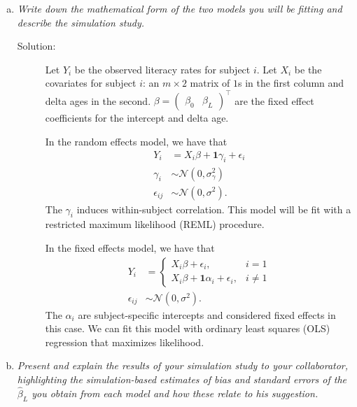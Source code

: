 \documentclass[11pt, letterpaper]{article}
\begin{document}
\begin{enumerate}[(a)]
\addtocounter{enumi}{2}
\item {\em Write down the mathematical form of the two models you will be fitting and describe the simulation study.}

  \begin{description}
  \item[Solution:] Let $Y_i$ be the observed literacy rates for subject $i$. Let
    $X_i$ be the covariates for subject $i$: an $m \times 2$ matrix of $1$s in
    the first column and delta ages in the second. $\beta = \begin{pmatrix}
      \beta_0 & \beta_L
    \end{pmatrix}^\intercal$ are the fixed effect coefficients for the intercept
    and delta age.

    In the random effects model, we have that
    \begin{align}
      Y_i
      &= X_i\beta + \mathbf{1}\gamma_i + \epsilon_i
        \label{eqn:random_effects_model} \\
      \gamma_i
      &\sim \mathcal{N}\left(0, \sigma_\gamma^2\right) \nonumber \\
      \epsilon_{ij}
      &\sim \mathcal{N}\left(0, \sigma^2\right). \nonumber
    \end{align}
    The $\gamma_i$ induces within-subject correlation. This model will be fit
    with a restricted maximum likelihood (REML) procedure.

    In the fixed effects model, we have that
    \begin{align}
      Y_i
      &= \begin{cases}
        X_i\beta + \epsilon_i, & i = 1 \\
        X_i\beta + \mathbf{1}\alpha_i + \epsilon_i, & i \neq 1
      \end{cases} \label{eqn:fixed_effects_model} \\
      \epsilon_{ij}
      &\sim \mathcal{N}\left(0, \sigma^2\right). \nonumber
    \end{align}
    The $\alpha_i$ are subject-specific intercepts and considered fixed effects
    in this case. We can fit this model with ordinary least squares (OLS)
    regression that maximizes likelihood.
  \end{description}


\item {\em  Present and explain the results of your simulation study to your collaborator, highlighting the simulation-based estimates of bias and standard errors of the $\hat{\beta}_L$ you obtain from each model and how these relate to his suggestion.}


\end{enumerate}
\end{document}
